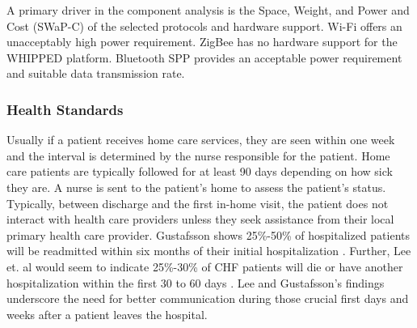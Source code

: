 A primary driver in the component analysis is the Space, Weight, and Power and Cost (SWaP-C) of the selected protocols and hardware support. Wi-Fi offers an unacceptably high power requirement. ZigBee has no hardware support for the WHIPPED platform. Bluetooth SPP provides an acceptable power requirement and suitable data transmission rate.

\subsubsection{Health Standards}
\label{subsubsec:HealthStandards}
Usually if a patient receives home care services, they are seen within one week and the interval is determined by the nurse responsible for the patient. Home care patients are typically followed for at least 90 days depending on how sick they are. A nurse is sent to the patient's home to assess the patient's status. Typically, between discharge and the first in-home visit, the patient does not interact with health care providers unless they seek assistance from their local primary health care provider. Gustafsson shows 25\%-50\% of hospitalized patients will be readmitted within six months of their initial hospitalization \cite{Gustafsson2004}. Further, Lee et. al would seem to indicate 25\%-30\% of CHF patients will die or have another hospitalization within the first 30 to 60 days \cite{Lee2011}. Lee and Gustafsson's findings underscore the need for better communication during those crucial first days and weeks after a patient leaves the hospital.

